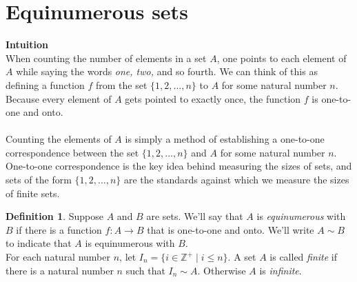 \documentclass{report}
\theoremstyle{definition}
\newtheorem*{definition}{Definition}
\begin{document}
\section{Equinumerous sets}
\textbf{Intuition}\\
When counting the number of elements in a set $A$, one points to each element of $A$ while saying the words \textit{one, two,} and so fourth.
We can think of this as defining a function $f$ from the set $\{1,2,\ldots,n\}$ to $A$ for some natural number $n$. Because every element of $A$
gets pointed to exactly once, the function $f$ is one-to-one and onto.\\
\vspace{1mm}\\
Counting the elements of $A$ is simply a method of establishing a one-to-one correspondence between the set $\{1,2,\ldots,n\}$ and $A$ for some 
natural number $n$. One-to-one correspondence is the key idea behind measuring the sizes of sets, and sets of the form $\{1,2,\ldots,n\}$ are the 
standards against which we measure the sizes of finite sets.
\begin{definition}
Suppose $A$ and $B$ are sets. We'll say that $A$ is \textit{equinumerous} with $B$ if there is a function $f:A\to B$ that is one-to-one and onto.
We'll write $A\sim B$ to indicate that $A$ is equinumerous with $B$.\\
\indent For each natural number $n$, let $I_n=\{i\in\mathbb Z^+\mid i\leq n\}$. A set
$A$ is called \textit{finite} if there is a natural number $n$ such that
$I_n\sim A$. Otherwise $A$ is \textit{infinite}.
\end{definition}
\newpage
\end{document}
